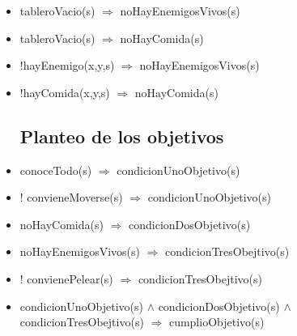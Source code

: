 \begin{itemize}
\item tableroVacio(s) $\Rightarrow$ noHayEnemigosVivos(s) 
\item tableroVacio(s) $\Rightarrow$ noHayComida(s)

\item !hayEnemigo(x,y,s) $\Rightarrow$ noHayEnemigosVivos(s) 
\item !hayComida(x,y,s) $\Rightarrow$ noHayComida(s)

\subsection{Planteo de los objetivos}
\item conoceTodo(s) $\Rightarrow$ condicionUnoObjetivo(s)

\item ! convieneMoverse(s) $\Rightarrow$ condicionUnoObjetivo(s)

\item noHayComida(s) $\Rightarrow$ condicionDosObjetivo(s)
\item noHayEnemigosVivos(s) $\Rightarrow$ condicionTresObejtivo(s)
\item ! convienePelear(s) $\Rightarrow$ condicionTresObejtivo(s)

\item  condicionUnoObjetivo(s) $\land$ condicionDosObjetivo(s)
$\land$ condicionTresObejtivo(s) $\Rightarrow$ cumplioObjetivo(s)

\end{itemize}


